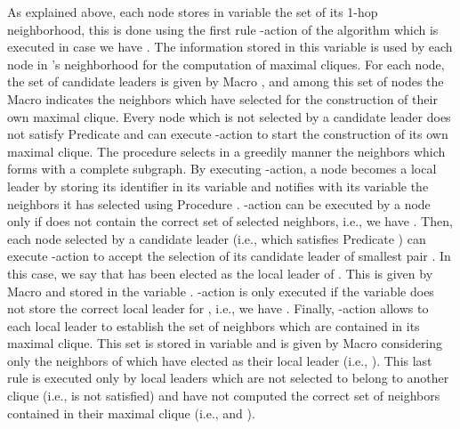\documentclass[11pt,letterpaper,onecolumn]{article}
\begin{document}
As explained above, each node stores in variable  the set of its 1-hop neighborhood, this is done using the first rule -action of the algorithm which is executed in case we have . The information stored in this variable is used by each node in 's neighborhood for the computation of maximal cliques. For each node, the set of candidate leaders is given by Macro , and among this set of nodes the Macro  indicates the neighbors which have selected  for the construction of their own maximal clique. Every node  which is not selected by a candidate leader does not satisfy Predicate  and can execute -action to start the construction of its own maximal clique. The procedure  selects in a greedily manner the neighbors which forms with  a complete subgraph. By executing -action, a node  becomes a local leader by storing its identifier in its variable  and notifies with its variable  the neighbors it has selected using Procedure . -action can be executed by a node  only if  does not contain the correct set of selected neighbors, i.e., we have . Then, each node  selected by a candidate leader (i.e., which satisfies Predicate ) can execute -action to accept the selection of its candidate leader  of smallest pair . In this case, we say that  has been elected as the local leader of . This is given by Macro  and stored in the variable . -action is only executed if the variable  does not store the correct local leader for , i.e., we have . Finally, -action allows to each local leader  to establish the set of neighbors  which are contained in its maximal clique. This set is stored in variable  and is given by Macro  considering only the neighbors  of  which have elected  as their local leader (i.e., ). This last rule is executed only by local leaders 
which are not selected to belong to another clique (i.e.,  is not satisfied) and have not computed the correct set of neighbors contained in their maximal clique (i.e.,  and ).
\end{document}
